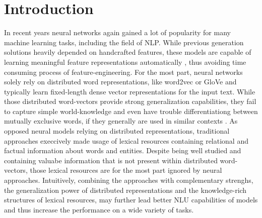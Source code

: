 \section{Introduction}
In recent years neural networks again gained a lot of popularity for many machine learning tasks, including the field of \ac{NLP}. While previous generation solutions heavily depended on handcrafted features, these models are capable of learning meaningful feature representations automatically \citep{bengio2013representation}, thus avoiding time consuming process of feature-engineering. For the most part, neural networks solely rely on distributed word representations, like word2vec \citep{mikolov2013distributed} or GloVe \citep{pennington2014glove} and typically learn fixed-length dense vector representations for the input text. While those distributed word-vectors provide strong generalization capabilities, they fail to capture simple world-knowledge \citep{celikyilmaz2010enriching} and even have trouble differentiationg between mutually exclusive words, if they generally are used in similar contexts \citep{vulic2017morph}. As opposed neural models relying on distributed representations, traditional approaches execcively made usage of lexical resources containing relational and factual information about words and entities. Despite being well studied and containing valuabe information that is not present within distributed word-vectors, those lexical resources are for the most part ignored by neural approaches. Intuitively, combining the approaches with complementary strenghs, the generalization power of distributed representations and the knowledge-rich structures of lexical resources, may further lead better \ac{NLU} capabilities of models and thus increase the performance on a wide variety of tasks.

